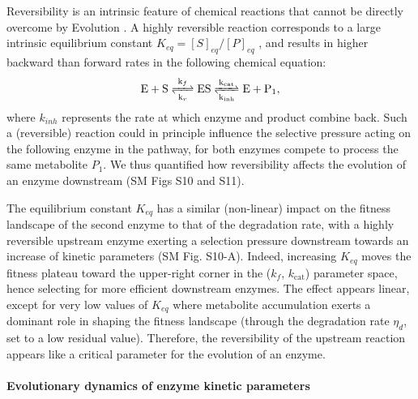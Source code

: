Reversibility is an intrinsic feature of chemical reactions that cannot be directly overcome by Evolution \citep{Haldane30,Cornish-Bowden79a}. A highly reversible reaction corresponds to a large intrinsic equilibrium constant $K_{eq}=[S]_{eq}/[P]_{eq}$ \citep{Klipp94}, and results in higher backward than forward rates in the following chemical equation: \begin{equation}
\ce{ E + S <=>[k_{f}][k_{r}] ES <=>[k_{cat}][k_{inh}] E + P_1 },
\label{chemMM_fullrev}
\end{equation}
where $k_{inh}$ represents the rate at which enzyme and product combine back. Such a (reversible) reaction could in principle influence the selective pressure acting on the following enzyme in the pathway, for both enzymes compete to process the same metabolite $P_1$. We thus quantified how reversibility affects the evolution of an enzyme downstream (SM Figs S10 and S11). 

The equilibrium constant $K_{eq}$ has a similar (non-linear) impact on the fitness landscape of the second enzyme to that of the degradation rate, with a highly reversible upstream enzyme exerting a selection pressure downstream towards an increase of kinetic parameters (SM Fig. S10-A). Indeed, increasing $K_{eq}$ moves the fitness plateau toward the upper-right corner in the ($k_f$, $k_\text{cat}$) parameter space, hence selecting for more efficient downstream enzymes. The effect appears linear, except for very low values of $K_{eq}$ where metabolite accumulation exerts a dominant role in shaping the fitness landscape (through the degradation rate $\eta_d$, set to a low residual value). Therefore, the reversibility of the upstream reaction appears like a critical parameter for the evolution of an enzyme. 


\noindent \paragraph{Evolutionary dynamics of enzyme kinetic parameters}

